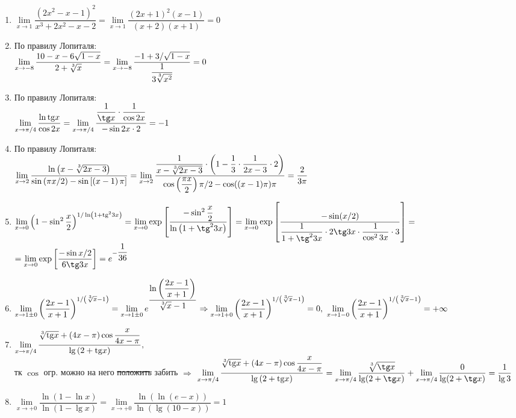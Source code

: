 \documentclass{report}
\begin{document}
\sol
\begin{enumerate}
\item
$
\lim\limits_{x\to1}\dfrac{\left(2x^{2}-x-1\right)^{2}}{x^{3}+2x^{2}-x-2}=\lim\limits_{x\to1}\dfrac{(2x+1)^2(x-1)}{(x+2)(x+1)}=0
$
\item
По правилу Лопиталя:\\
$
\lim\limits_{x\to-8}\dfrac{10-x-6\sqrt{1-x}}{2+\sqrt[\leftroot{0}\uproot{2}3]{x}}=\lim\limits_{x\to-8}\dfrac{-1+3/\sqrt{1-x}}{\dfrac{1}{3\sqrt[\leftroot{0}\uproot{2}3]{x^2}}}=0
$
\item
По правилу Лопиталя:\\
$
\lim\limits_{x\to\pi/4}\dfrac{\ln\mathrm{tg}x}{\cos2x}=\lim\limits_{x\to\pi/4}\dfrac{\dfrac{1}{\tg x}\cdot\dfrac{1}{\cos2x}}{-\sin 2x \cdot 2}=-1
$
\item
По правилу Лопиталя:\\
$
\lim\limits_{x\to2}\dfrac{\ln\left(x-\sqrt[\leftroot{0}\uproot{2}3]{2x-3}\right)}{\sin\left(\pi x/2\right)-\sin\left[\left(x-1\right)\pi\right]}=\lim\limits_{x\to2}\dfrac{\dfrac{1}{x-\sqrt[\leftroot{0}\uproot{2}3]{2x-3}}\cdot\left(1-\dfrac{1}{3}\cdot\dfrac{1}{2x-3}\cdot 2 \right)}{\cos\left({\dfrac{\pi x}{2}}\right)\pi/2-\cos((x-1)\pi)\pi}=\dfrac{2}{3\pi}
$
\item
$
\lim\limits_{x\to0}\left(1-\sin^2\dfrac{x}{2}\right)^{1/\ln\left(1+\mathrm{tg}^23x\right)}=\lim\limits_{x\to0}\exp\left[\dfrac{-\sin^2\dfrac{x}{2}}{\ln\left(1+\tg^2 3x\right)}\right]=
\lim\limits_{x\to0}\exp\left[\dfrac{-\sin(x/2)}{\dfrac{1}{1+\tg^2 3x}\cdot2\tg 3x\cdot\dfrac{1}{\cos^2 3x}\cdot 3}\right]=
$
\quad \\
$
=\lim\limits_{x\to0} \exp\left[\dfrac{-\sin x/2}{6\tg 3x}\right]=e^{-\dfrac{1}{36}}
$
\item
$
\lim\limits_{x\to1\pm0}\left(\dfrac{2x-1}{x+1}\right)^{1/\left(\sqrt[\leftroot{0}\uproot{2}3]{x}-1\right)}=\lim\limits_{x\to1\pm0} e^{\dfrac{\ln\left(\dfrac{2x-1}{x+1}\right)}{\sqrt[\leftroot{0}\uproot{2}3]{x}-1}}\Rightarrow
\lim\limits_{x\to1+0}\left(\dfrac{2x-1}{x+1}\right)^{1/\left(\sqrt[\leftroot{0}\uproot{2}3]{x}-1\right)}=0,\ \lim\limits_{x\to1-0}\left(\dfrac{2x-1}{x+1}\right)^{1/\left(\sqrt[\leftroot{0}\uproot{2}3]{x}-1\right)}=+\infty
$
\item
$
\lim\limits_{x\to\pi/4}\dfrac{\sqrt[\leftroot{0}\uproot{2}3]{\mathrm{tg}x}+(4x-\pi)\cos\dfrac{x}{4x-\pi}}{\lg\left(2+\mathrm{tg}x\right)},
$
\\
тк $\cos$ огр. можно на него \sout{положить} забить $\Rightarrow$
$
\lim\limits_{x\to\pi/4}\dfrac{\sqrt[\leftroot{0}\uproot{2}3]{\mathrm{tg}x}+(4x-\pi)\cos\dfrac{x}{4x-\pi}}{\lg\left(2+\mathrm{tg}x\right)}=
\lim\limits_{x\to\pi/4}\dfrac{\sqrt[\leftroot{0}\uproot{2}3]{\tg x}}{\lg(2+\tg x)}+\lim\limits_{x\to\pi/4}\dfrac{0}{\lg(2+\tg x)}=\dfrac{1}{\lg 3}
$
\item
$
\lim\limits_{x\to+0}\dfrac{\ln\left(1-\ln x\right)}{\ln\left(1-\lg x\right)}=\lim\limits_{x\to+0}\dfrac{\ln(\ln(e-x))}{\ln(\lg (10-x))}=1
$
\end{enumerate}
\end{document}
